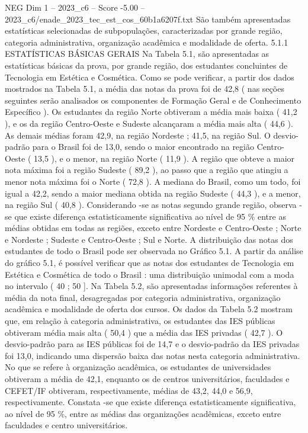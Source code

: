 \begin{textsample}{NEG Dim 1 – 2023\_c6 – Score -5.00 – 2023\_c6/enade\_2023\_tec\_est\_cos\_60b1a6207f.txt}
São também apresentadas estatísticas selecionadas de subpopulações, caracterizadas por grande região, categoria administrativa, organização acadêmica e modalidade de oferta. 5.1.1 ESTATÍSTICAS BÁSICAS GERAIS Na Tabela 5.1, são apresentadas as estatísticas básicas da prova, por grande região, dos estudantes concluintes de Tecnologia em Estética e Cosmética.
Como se pode verificar, a partir dos dados mostrados na Tabela 5.1, a média das notas da prova foi de 42,8 ( nas seções seguintes serão analisados os componentes de Formação Geral e de Conhecimento Específico ).
Os estudantes da região Norte obtiveram a média mais baixa ( 41,2 ), e os da região Centro-Oeste e Sudeste alcançaram a média mais alta ( 44,6 ).
As demais médias foram 42,9, na região Nordeste ; 41,5, na região Sul.
O desvio-padrão para o Brasil foi de 13,0, sendo o maior encontrado na região Centro-Oeste ( 13,5 ), e o menor, na região Norte ( 11,9 ).
A região que obteve a maior nota máxima foi a região Sudeste ( 89,2 ), ao passo que a região que atingiu a menor nota máxima foi o Norte ( 72,8 ).
A mediana do Brasil, como um todo, foi igual a 42,2, sendo a maior mediana obtida na região Sudeste ( 44,3 ), e a menor, na região Sul ( 40,8 ).
Considerando -se as notas segundo grande região, observa -se que existe diferença estatisticamente significativa ao nível de 95 \% entre as médias obtidas em todas as regiões, exceto entre Nordeste e Centro-Oeste ; Norte e Nordeste ; Sudeste e Centro-Oeste ; Sul e Norte.
A distribuição das notas dos estudantes de todo o Brasil pode ser observada no Gráfico 5.1.
A partir da análise do gráfico 5.1, é possível verificar que as notas dos estudantes de Tecnologia em Estética e Cosmética de todo o Brasil : uma distribuição unimodal com a moda no intervalo ( 40 ; 50 ].
Na Tabela 5.2, são apresentadas informações referentes à média da nota final, desagregadas por categoria administrativa, organização acadêmica e modalidade de oferta dos cursos.
Os dados da Tabela 5.2 mostram que, em relação à categoria administrativa, os estudantes das IES públicas obtiveram média mais alta ( 50,4 ) que a média das IES privadas ( 42,7 ).
O desvio-padrão para as IES públicas foi de 14,7 e o desvio-padrão da IES privadas foi 13,0, indicando uma dispersão baixa das notas nesta categoria administrativa.
No que se refere à organização acadêmica, os estudantes de universidades obtiveram a média de 42,1, enquanto os de centros universitários, faculdades e CEFET/IF obtiveram, respectivamente, médias de 43,2, 44,0 e 56,9, respectivamente.
Constata -se que existe diferença estatisticamente significativa, ao nível de 95 \%, entre as médias das organizações acadêmicas, exceto entre faculdades e centro universitários.

\end{textsample}
